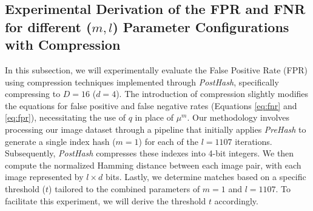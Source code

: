 \subsection{Experimental Derivation of the FPR and FNR for different (\(m, l\)) Parameter Configurations with Compression}

In this subsection, we will experimentally evaluate the False Positive Rate (FPR) using compression techniques implemented through \textit{PostHash}, specifically compressing to \(D = 16\) (\(d=4\)). The introduction of compression slightly modifies the equations for false positive and false negative rates (Equations \ref{eq:fnr} and \ref{eq:fpr}), necessitating the use of \(q\) in place of \(\mu^m\). Our methodology involves processing our image dataset through a pipeline that initially applies \textit{PreHash} to generate a single index hash (\(m=1\)) for each of the \(l=1107\) iterations. Subsequently, \textit{PostHash} compresses these indexes into 4-bit integers. We then compute the normalized Hamming distance between each image pair, with each image represented by \(l \times d\) bits. Lastly, we determine matches based on a specific threshold (\(t\)) tailored to the combined parameters of \(m=1\) and \(l=1107\). To facilitate this experiment, we will derive the threshold \(t\) accordingly.